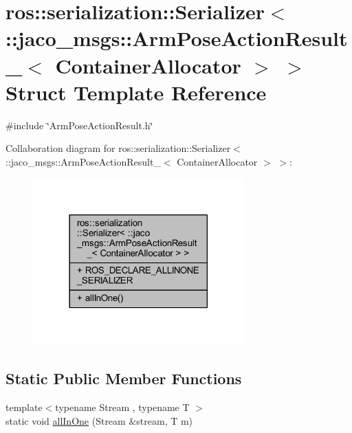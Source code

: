 \hypertarget{structros_1_1serialization_1_1Serializer_3_01_1_1jaco__msgs_1_1ArmPoseActionResult___3_01ContainerAllocator_01_4_01_4}{}\section{ros\+:\+:serialization\+:\+:Serializer$<$ \+:\+:jaco\+\_\+msgs\+:\+:Arm\+Pose\+Action\+Result\+\_\+$<$ Container\+Allocator $>$ $>$ Struct Template Reference}
\label{structros_1_1serialization_1_1Serializer_3_01_1_1jaco__msgs_1_1ArmPoseActionResult___3_01ContainerAllocator_01_4_01_4}


{\ttfamily \#include \char`\"{}Arm\+Pose\+Action\+Result.\+h\char`\"{}}



Collaboration diagram for ros\+:\+:serialization\+:\+:Serializer$<$ \+:\+:jaco\+\_\+msgs\+:\+:Arm\+Pose\+Action\+Result\+\_\+$<$ Container\+Allocator $>$ $>$\+:
\nopagebreak
\begin{figure}[H]
\begin{center}
\leavevmode
\includegraphics[width=230pt]{dc/d70/structros_1_1serialization_1_1Serializer_3_01_1_1jaco__msgs_1_1ArmPoseActionResult___3_01Contain90064c6f665b798553d0f4f8d0c83793}
\end{center}
\end{figure}
\subsection*{Static Public Member Functions}
\begin{DoxyCompactItemize}
\item 
{\footnotesize template$<$typename Stream , typename T $>$ }\\static void \hyperlink{structros_1_1serialization_1_1Serializer_3_01_1_1jaco__msgs_1_1ArmPoseActionResult___3_01ContainerAllocator_01_4_01_4_a32f2c8756f04347be8f1bdd16a97fee3}{all\+In\+One} (Stream \&stream, T m)
\end{DoxyCompactItemize}
